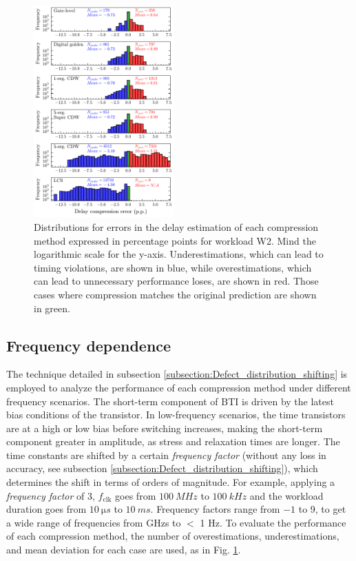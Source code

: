 \begin{figure}[!t]
    \includegraphics[width=0.48\textwidth,trim={0 0 0 0},clip]{images/ch2/error_delay_report_plot.pdf}
    \caption{Distributions for errors in the delay estimation of each compression method expressed in percentage points for workload W2. Mind the logarithmic scale for the y-axis. Underestimations, which can lead to timing violations, are shown in blue, while overestimations, which can lead to unnecessary performance loses, are shown in red. Those cases where compression matches the original prediction are shown in green.}
    \label{fig:delay_compression_error}
\end{figure}

\subsection{Frequency dependence}
\label{subsection:freq_dependence}
The technique detailed in subsection \ref{subsection:Defect_distribution_shifting} is employed to analyze the performance of each compression method under different frequency scenarios. The short-term component of BTI is driven by the latest bias conditions of the transistor. In low-frequency scenarios, the time transistors are at a high or low bias before switching increases, making the short-term component greater in amplitude, as stress and relaxation times are longer. The time constants are shifted by a certain \textit{frequency factor} (without any loss in accuracy, see subsection \ref{subsection:Defect_distribution_shifting}), which determines the shift in terms of orders of magnitude. For example, applying a \textit{frequency factor} of 3, $f_\text{clk}$ goes from $\qty{100}{MHz}$ to $\qty{100}{kHz}$ and the workload duration goes from $\qty{10}{\micro s}$ to $\qty{10}{ms}$. Frequency factors range from $-1$ to 9, to get a wide range of frequencies from GHzs to $<$ 1 Hz. To evaluate the performance of each compression method, the number of overestimations, underestimations, and mean deviation for each case are used, as in Fig. \ref{fig:delay_compression_error}. 

